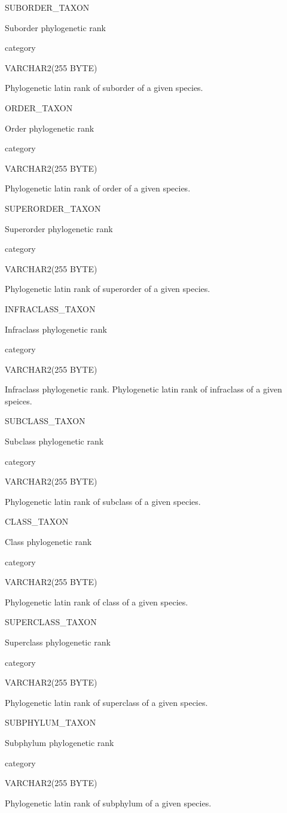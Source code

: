\documentclass[
  letterpaper,
  oneside,
  open=any]{scrbook}
\begin{document}
SUBORDER\_TAXON

Suborder phylogenetic rank

category

VARCHAR2(255 BYTE)

Phylogenetic latin rank of suborder of a given species.

ORDER\_TAXON

Order phylogenetic rank

category

VARCHAR2(255 BYTE)

Phylogenetic latin rank of order of a given species.

SUPERORDER\_TAXON

Superorder phylogenetic rank

category

VARCHAR2(255 BYTE)

Phylogenetic latin rank of superorder of a given species.

INFRACLASS\_TAXON

Infraclass phylogenetic rank

category

VARCHAR2(255 BYTE)

Infraclass phylogenetic rank. Phylogenetic latin rank of infraclass of a
given speices.

SUBCLASS\_TAXON

Subclass phylogenetic rank

category

VARCHAR2(255 BYTE)

Phylogenetic latin rank of subclass of a given species.

CLASS\_TAXON

Class phylogenetic rank

category

VARCHAR2(255 BYTE)

Phylogenetic latin rank of class of a given species.

SUPERCLASS\_TAXON

Superclass phylogenetic rank

category

VARCHAR2(255 BYTE)

Phylogenetic latin rank of superclass of a given species.

SUBPHYLUM\_TAXON

Subphylum phylogenetic rank

category

VARCHAR2(255 BYTE)

Phylogenetic latin rank of subphylum of a given species.
\end{document}
